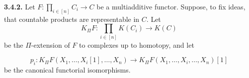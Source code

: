 \noindent\textbf{3.4.2.}\quad
{}
Let
$F\colon\prod_{i\in[n]}C_i\longrightarrow C$ be a multiadditive functor.
Suppose, to fix ideas, that countable products are representable in $C$. Let
\[
  K_{\Pi}F\colon\prod_{i\in[n]}K(C_i)\longrightarrow K(C)
\]
be the $\Pi$-extension of $F$ to complexes up to homotopy, and let

\[
  p_i\colon K_{\Pi}F(X_1,\ldots,X_i[1],\ldots,X_n)
  \longrightarrow K_{\Pi}F(X_1,\ldots,X_i,\ldots,X_n)[1]
\]
be the canonical functorial isomorphisms.
\endgroup
